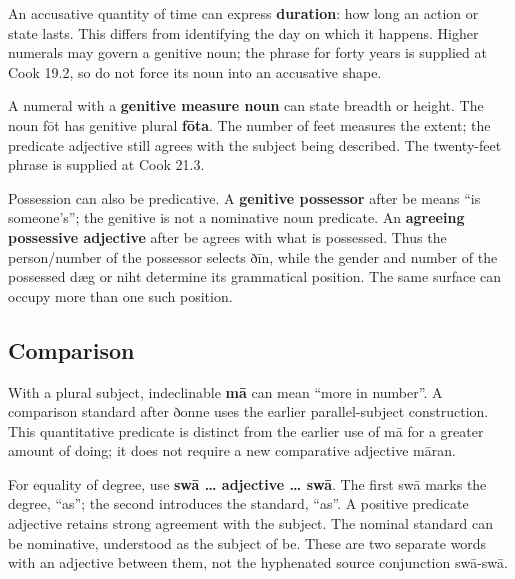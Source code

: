 An accusative quantity of time can express \textbf{duration}: how long an action or state lasts. This differs from identifying the day on which it happens. Higher numerals may govern a genitive noun; the phrase for forty years is supplied at Cook 19.2, so do not force its noun into an accusative shape.

A numeral with a \textbf{genitive measure noun} can state breadth or height. The noun fōt has genitive plural \textbf{fōta}. The number of feet measures the extent; the predicate adjective still agrees with the subject being described. The twenty-feet phrase is supplied at Cook 21.3.

Possession can also be predicative. A \textbf{genitive possessor} after be means “is someone’s”; the genitive is not a nominative noun predicate. An \textbf{agreeing possessive adjective} after be agrees with what is possessed. Thus the person/\allowbreak{}number of the possessor selects ðīn, while the gender and number of the possessed dæg or niht determine its grammatical position. The same surface can occupy more than one such position.

\subsection*{Comparison}

With a plural subject, indeclinable \textbf{mā} can mean “more in number”. A comparison standard after ðonne uses the earlier parallel-subject construction. This quantitative predicate is distinct from the earlier use of mā for a greater amount of doing; it does not require a new comparative adjective māran.

For equality of degree, use \textbf{swā … adjective … swā}. The first swā marks the degree, “as”; the second introduces the standard, “as”. A positive predicate adjective retains strong agreement with the subject. The nominal standard can be nominative, understood as the subject of be. These are two separate words with an adjective between them, not the hyphenated source conjunction swā-swā.

